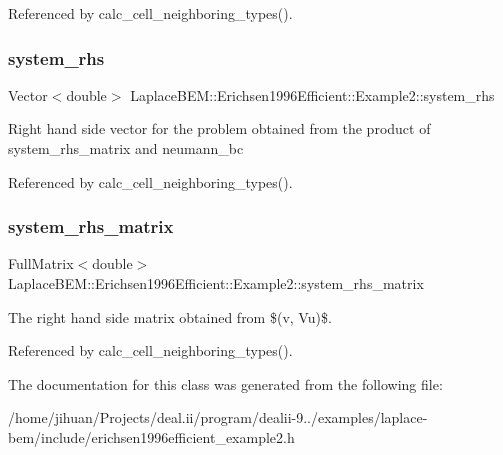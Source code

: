 Referenced by calc\+\_\+cell\+\_\+neighboring\+\_\+types().

\mbox{\label{classLaplaceBEM_1_1Erichsen1996Efficient_1_1Example2_a7de5f9e1f110ec7f842577a54dddd267}} 
\subsubsection{\texorpdfstring{system\+\_\+rhs}{system\_rhs}}
{\footnotesize\ttfamily Vector$<$double$>$ Laplace\+B\+E\+M\+::\+Erichsen1996\+Efficient\+::\+Example2\+::system\+\_\+rhs\hspace{0.3cm}{\ttfamily [private]}}

Right hand side vector for the problem obtained from the product of {\ttfamily system\+\_\+rhs\+\_\+matrix} and {\ttfamily neumann\+\_\+bc} 

Referenced by calc\+\_\+cell\+\_\+neighboring\+\_\+types().

\mbox{\label{classLaplaceBEM_1_1Erichsen1996Efficient_1_1Example2_a13e4add9320ecede8e53b7a633805740}} 
\subsubsection{\texorpdfstring{system\+\_\+rhs\+\_\+matrix}{system\_rhs\_matrix}}
{\footnotesize\ttfamily Full\+Matrix$<$double$>$ Laplace\+B\+E\+M\+::\+Erichsen1996\+Efficient\+::\+Example2\+::system\+\_\+rhs\+\_\+matrix\hspace{0.3cm}{\ttfamily [private]}}

The right hand side matrix obtained from \$(v, Vu)\$. 

Referenced by calc\+\_\+cell\+\_\+neighboring\+\_\+types().



The documentation for this class was generated from the following file\+:\begin{DoxyCompactItemize}
\item 
/home/jihuan/\+Projects/deal.\+ii/program/dealii-\/9../examples/laplace-\/bem/include/erichsen1996efficient\+\_\+example2.\+h\end{DoxyCompactItemize}
